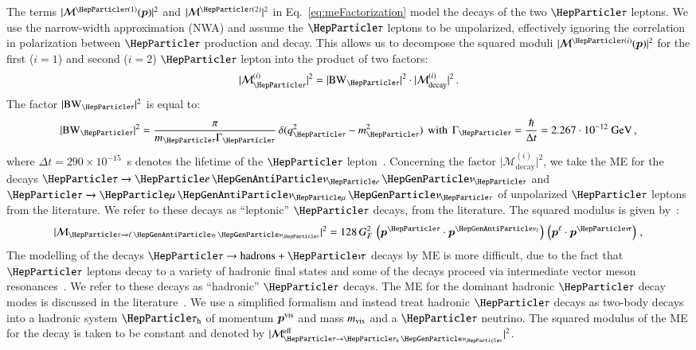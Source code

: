 The terms $\vert \mathcal{M}^{\Pgt(1)}(\bm{p}) \vert^{2}$ and $\vert
\mathcal{M}^{\Pgt(2)} \vert^{2}$ in Eq.~\ref{eq:meFactorization} model the decays of the two $\Pgt$ leptons.
We use the narrow-width approximation (NWA) and assume the $\Pgt$ leptons to be unpolarized,
effectively ignoring the correlation in polarization between $\Pgt$ production and decay.
This allows us to decompose the squared moduli $\vert
\mathcal{M}^{\Pgt(i)}(\bm{p}) \vert^{2}$ for the first ($i=1$) and
second ($i=2$) $\Pgt$ lepton into the product of two factors:
\begin{equation}
\vert \mathcal{M}^{(i)}_{\Pgt} \vert^{2} = \vert \BW_{\Pgt} \vert^{2} \cdot \vert \mathcal{M}^{(i)}_{\textrm{decay}} \vert^{2} \, .
\end{equation}
The factor $\vert \BW_{\Pgt} \vert^{2}$ is equal to:
\begin{equation}
\vert \BW_{\Pgt} \vert^{2} = \frac{\pi}{m_{\Pgt}\Gamma_{\Pgt}} \,
\delta ( q_{\Pgt}^{2} - m_{\Pgt}^{2} ) \, \mbox{ with } \, 
\Gamma_{\Pgt} = \frac{\hbar}{\Delta t} =
 2.267 \cdot 10^{-12}\textrm{~\GeV} \, ,
\end{equation}
where $\Delta t = 290 \times 10^{-15}$~s denotes the lifetime of the
$\Pgt$ lepton~\cite{PDG}.
Concerning the factor $\vert \mathcal{M}^{(i)}_{\textrm{decay}}
\vert^{2}$, we take the ME for the decays $\Pgt \to \enunu$ and $\Pgt
\to \mununu$ of unpolarized $\Pgt$ leptons from the literature.
We refer to these decays as ``leptonic'' $\Pgt$ decays, from the literature.
The squared modulus is given by~\cite{Barger:1987nn}:
\begin{equation}
\vert\mathcal{M}_{\Pgt \to \ellnunu} \vert^{2} = 128 \, G^{2}_{F} \, \left( \bm{p}^{\Pgt} \cdot \bm{p}^{\APnu_{\Plepton}} \right) \, \left(\bm{p}^{\Plepton} \cdot \bm{p}^{\Pnut} \right) \, , 
\label{eq:leptonic_tau_decays_ME}
\end{equation}
The modelling of the decays $\Pgt \to \textrm{hadrons} + \Pnut$ decays
by ME is more difficult, 
due to the fact that $\Pgt$ leptons decay to a variety of hadronic
final states and some of the decays proceed via intermediate vector
meson resonances~\cite{PDG}.
We refer to these decays as ``hadronic'' $\Pgt$ decays.
The ME for the dominant hadronic $\Pgt$ decay modes is discussed in the literature~\cite{Bullock:1992yt,Raychaudhuri:1995kv}.
We use a simplified formalism and instead treat hadronic $\Pgt$ decays as two-body decays into a hadronic system $\tauh$ of momentum $\bm{p^{\textrm{vis}}}$ and mass $m_{\textrm{vis}}$ and a $\Pgt$ neutrino.
The squared modulus of the ME for the decay is taken to be constant and denoted by $\vert\mathcal{M}^{\eff}_{\Pgt \to \tauhnu}\vert^{2}$.
